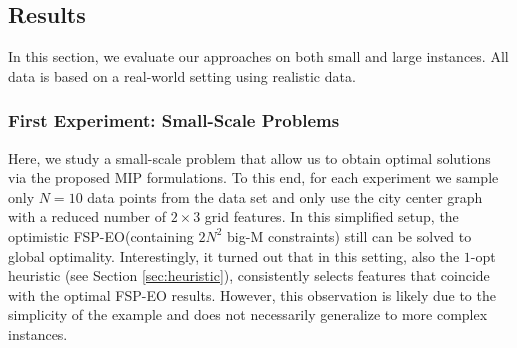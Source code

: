 \documentclass[11pt, a4paper]{article}
\newcommand{\fspeo}{FSP-EO\xspace}
\newcommand{\FRil}[1]{\todo[color=black, textcolor=white, inline, author=FR]{#1}}
\newcommand{\MHil}[1]{\todo[color=gray, textcolor=yellow, inline, author=MH]{#1}}
\newcommand{\MGil}[1]{\todo[color=gray, textcolor=black, inline, author=MG]{#1}}
\begin{document}
\subsection{Results}
In this section, we evaluate our approaches on both small and large instances. All data is based on a real-world setting using realistic data.  

\subsubsection{First Experiment: Small-Scale Problems}


Here, we study a small-scale problem that allow us to obtain  optimal solutions via the proposed MIP formulations.
To this end, for each experiment we sample only $N=10$ data points from the data set and only use the city center graph with a reduced number of $2 \times 3$ grid features. In this simplified setup, the optimistic \fspeo (containing $2N^2$ big-M constraints) still can be solved to global optimality.
Interestingly, it turned out that  in this setting, also the $1$-opt
heuristic (see Section \ref{sec:heuristic}), consistently selects features that coincide with the optimal \fspeo results. However, this observation is likely due to the simplicity of the example and does not necessarily generalize to more complex instances.


\end{document}

